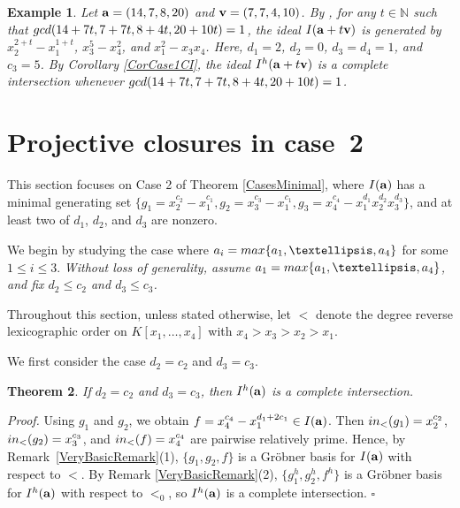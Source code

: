 \documentclass[10pt,a4paper]{amsart}
\newtheorem{thm1}{Theorem}[section]
\newtheorem{ex1}[thm1]{Example}
\begin{document}
\begin{ex1} {\rm Let ${\bf a}=(14, 7, 8, 20)$ and ${\bf v}=(7,7,4,10)$. By \cite[Theorem 2.6]{Katsa}, for any $t \in \mathbb{N}$ such that ${\rm gcd}(14+7t,7+7t,8+4t,20+10t)=1$, the ideal $I({\bf a}+t{\bf v})$ is generated by $x_{2}^{2+t}-x_{1}^{1+t}$, $x_{3}^{5}-x_{4}^{2}$, and $x_{1}^{2}-x_{3}x_{4}$. Here, $d_1=2$, $d_2=0$, $d_3=d_4=1$, and $c_3=5$. By Corollary \ref{CorCase1CI}, the ideal $I^{h}({\bf a}+t{\bf v})$ is a complete intersection whenever ${\rm gcd}(14+7t,7+7t,8+4t,20+10t)=1$.}
\end{ex1}




\section{Projective closures in case~2}

This section focuses on Case 2 of Theorem \ref{CasesMinimal}, where $I({\bf a})$ has a minimal generating set $\{g_{1}=x_{2}^{c_2}-x_{1}^{c_1}, g_{2}=x_{3}^{c_3}-x_{1}^{c_1}, g_{3}=x_{4}^{c_4}-x_{1}^{d_1}x_{2}^{d_2}x_{3}^{d_3}\}$, and at least two of $d_1$, $d_2$, and $d_3$ are nonzero.

We begin by studying the case where $a_{i} = {\rm max}\{a_1,\ldots,a_4\}$ for some $1 \leq i \leq 3$. {\em Without loss of generality, assume $a_1={\rm max}\{a_1,\ldots,a_4\}$, and fix $d_{2} \leq c_2$ and $d_{3} \leq c_3$.}

Throughout this section, unless stated otherwise, let $<$ denote the degree
reverse lexicographic order on $K[x_1,\ldots,x_4]$ with
$x_4>x_3>x_2>x_1$.

We first consider the case $d_2=c_{2}$ and $d_{3}=c_3$.

\begin{thm1} \label{Veryfirst} If $d_2=c_{2}$ and $d_{3}=c_3$, then $I^{h}({\bf a})$ is a complete intersection.
\end{thm1}

{\em \noindent Proof.} Using $g_1$ and $g_2$, we obtain $f=x_{4}^{c_4}-x_{1}^{d_1+2c_1} \in I({\bf a})$. Then ${\rm in}_{<}(g_1)=x_{2}^{c_2}$, ${\rm in}_{<}(g_2)=x_{3}^{c_3}$, and ${\rm in}_{<}(f)=x_{4}^{c_4}$ are pairwise relatively prime. Hence, by Remark~\ref{VeryBasicRemark}(1), $\{g_1, g_2, f\}$ is a Gr\"obner basis for $I({\bf a})$ with respect to $<$. By Remark \ref{VeryBasicRemark}(2), $\{g_{1}^{h}, g_{2}^{h}, f^{h}\}$ is a Gr\"obner basis for $I^{h}({\bf a})$ with respect to $<_{0}$, so $I^{h}({\bf a})$ is a complete intersection. \hfill $\square$ \par\vspace{0.5\baselineskip}
\end{document}
